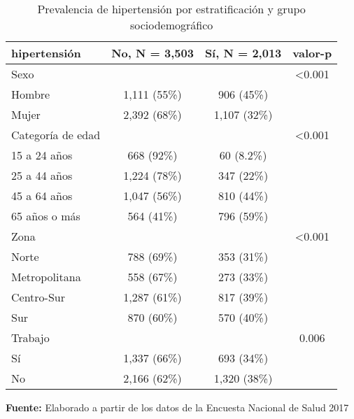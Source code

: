 \documentclass{aa}
\begin{document}
\begin{table}[]
\caption{\small Prevalencia de hipertensión por estratificación y grupo sociodemográfico}
    \centering
    \small
    
    \begin{tabular}{lccc}
\toprule
\textbf{hipertensión} & \textbf{No}, N = 3,503 & \textbf{Sí}, N = 2,013 & valor-p \\ 
\midrule
Sexo &  &  & <0.001 \\ 
\-\hspace{5mm} \tiny Hombre & 1,111 (55\%) & 906 (45\%) &  \\ 
\-\hspace{5mm} \tiny Mujer & 2,392 (68\%) & 1,107 (32\%) &  \\ 
Categoría de edad &  &  & <0.001 \\ 
\-\hspace{5mm} \tiny 15 a 24 años & 668 (92\%) & 60 (8.2\%) &  \\ 
\-\hspace{5mm} \tiny 25 a 44 años & 1,224 (78\%) & 347 (22\%) &  \\ 
\-\hspace{5mm} \tiny 45 a 64 años & 1,047 (56\%) & 810 (44\%) &  \\ 
\-\hspace{5mm} \tiny 65 años o más & 564 (41\%) & 796 (59\%) &  \\ 
Zona &  &  & <0.001 \\ 
\-\hspace{5mm} \tiny Norte & 788 (69\%) & 353 (31\%) &  \\ 
\-\hspace{5mm} \tiny Metropolitana & 558 (67\%) & 273 (33\%) &  \\ 
\-\hspace{5mm} \tiny Centro-Sur & 1,287 (61\%) & 817 (39\%) &  \\ 
\-\hspace{5mm} \tiny Sur & 870 (60\%) & 570 (40\%) &  \\ 
Trabajo &  &  & 0.006 \\ 
\-\hspace{5mm} \tiny Sí & 1,337 (66\%) & 693 (34\%) &  \\ 
\-\hspace{5mm} \tiny No & 2,166 (62\%) & 1,320 (38\%) &  \\ 
 \bottomrule
\end{tabular}
    \vspace{1ex}
    
    {\raggedright \small \textbf{Fuente:} Elaborado a partir de los datos de la Encuesta Nacional de Salud 2017 \par}
\end{table}
\end{document}
